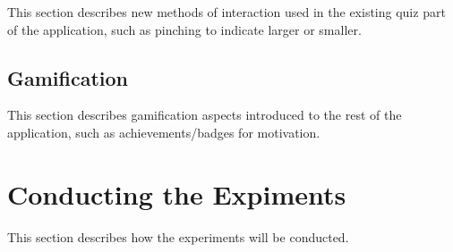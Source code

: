 This section describes new methods of interaction used in the existing quiz part of the application, such as pinching to indicate larger or smaller.


\subsection{Gamification}

This section describes gamification aspects introduced to the rest of the application, such as achievements/badges for motivation.


\section{Conducting the Expiments}

This section describes how the experiments will be conducted.